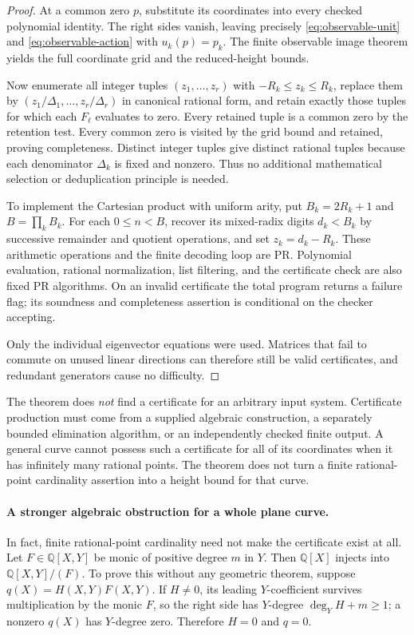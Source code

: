 \begin{proof}
At a common zero $p$, substitute its coordinates into every checked
polynomial identity.  The right sides vanish, leaving precisely
\eqref{eq:observable-unit} and \eqref{eq:observable-action} with
$u_k(p)=p_k$.  The finite observable image theorem yields the full
coordinate grid and the reduced-height bounds.

Now enumerate all integer tuples $(z_1,\ldots,z_r)$ with
$-R_k\le z_k\le R_k$, replace them by
$(z_1/\Delta_1,\ldots,z_r/\Delta_r)$ in canonical rational form,
and retain exactly those tuples for which each $F_\ell$ evaluates
to zero.  Every retained tuple is a common zero by the retention test.
Every common zero is visited by the grid bound and retained, proving
completeness.  Distinct integer tuples give distinct rational tuples
because each denominator $\Delta_k$ is fixed and nonzero.  Thus no
additional mathematical selection or deduplication principle is needed.

To implement the Cartesian product with uniform arity, put
$B_k=2R_k+1$ and $B=\prod_kB_k$.  For each $0\le n<B$, recover
its mixed-radix digits $d_k<B_k$ by successive remainder and quotient
operations, and set $z_k=d_k-R_k$.  These arithmetic operations and
the finite decoding loop are PR.  Polynomial evaluation, rational
normalization, list filtering, and the certificate check are also
fixed PR algorithms.  On an invalid certificate the total program
returns a failure flag; its soundness and completeness assertion is
conditional on the checker accepting.

Only the individual eigenvector equations were used.  Matrices that
fail to commute on unused linear directions can therefore still be
valid certificates, and redundant generators cause no difficulty.
\end{proof}

The theorem does \emph{not} find a certificate for an arbitrary input
system.  Certificate production must come from a supplied algebraic
construction, a separately bounded elimination algorithm, or an
independently checked finite output.  A general curve cannot possess
such a certificate for all of its coordinates when it has infinitely
many rational points.  The theorem does not turn a finite rational-point
cardinality assertion into a height bound for that curve.

\paragraph{A stronger algebraic obstruction for a whole plane curve.}
In fact, finite rational-point cardinality need not make the certificate
exist at all.  Let $F\in\mathbb Q[X,Y]$ be monic of positive degree
$m$ in $Y$.  Then $\mathbb Q[X]$ injects into
$\mathbb Q[X,Y]/(F)$.  To prove this without any geometric theorem,
suppose $q(X)=H(X,Y)F(X,Y)$.  If $H\ne0$, its leading
$Y$-coefficient survives multiplication by the monic $F$, so the
right side has $Y$-degree $\deg_YH+m\ge1$; a nonzero $q(X)$
has $Y$-degree zero.  Therefore $H=0$ and $q=0$.

